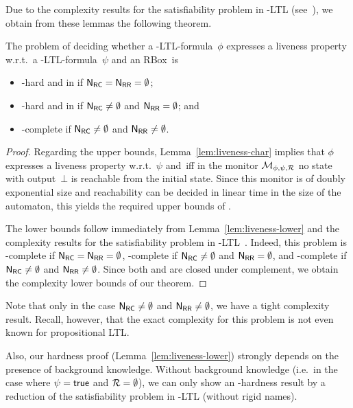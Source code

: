 \noindent
Due to the complexity results for the satisfiability problem in \ALC-LTL
(see~\cite{BaGL-ToCL12}), we obtain from these lemmas the following theorem.

\begin{theorem}
    The problem of deciding whether a \SHOQ-LTL-formula~$\phi$ expresses a
    liveness property w.r.t.~a \SHOQ-LTL-formula~$\psi$ and an RBox~\Rmc is
    \begin{itemize}
        \item \ExpTime-hard and in \TwoExpTime if $\mathsf{N_{RC}}=\mathsf{N_{RR}}=\emptyset$;
        \item \coNExpTime-hard and in \TwoExpTime if $\mathsf{N_{RC}}\ne\emptyset$ and
            $\mathsf{N_{RR}}=\emptyset$; and
        \item \TwoExpTime-complete if $\mathsf{N_{RC}}\ne\emptyset$ and $\mathsf{N_{RR}}\ne\emptyset$.
    \end{itemize}
\end{theorem}

\begin{proof}
    Regarding the upper bounds, Lemma~\ref{lem:liveness-char} implies that
    $\phi$ expresses a liveness property w.r.t.~$\psi$ and~\Rmc iff in the
    monitor $\mathcal{M}_{\phi,\psi,\mathcal{R}}$ no state with output~$\bot$ is reachable
    from the initial state.  Since this monitor is of doubly exponential size
    and reachability can be decided in linear time in the size of the automaton,
    this yields the required upper bounds of \TwoExpTime.

    The lower bounds follow immediately from Lemma~\ref{lem:liveness-lower} and
    the complexity results for the satisfiability problem in
    \ALC-LTL~\cite{BaGL-ToCL12}.  Indeed, this problem is \ExpTime-complete if
    $\mathsf{N_{RC}}=\mathsf{N_{RR}}=\emptyset$, \NExpTime-complete if $\mathsf{N_{RC}}\ne\emptyset$ and
    $\mathsf{N_{RR}}=\emptyset$, and \TwoExpTime-complete if $\mathsf{N_{RC}}\ne\emptyset$ and
    $\mathsf{N_{RR}}\ne\emptyset$.  Since both \ExpTime and \TwoExpTime are closed under
    complement, we obtain the complexity lower bounds of our theorem.
\end{proof}

\noindent
Note that only in the case $\mathsf{N_{RC}}\ne\emptyset$ and $\mathsf{N_{RR}}\ne\emptyset$, we have a
tight complexity result.  Recall, however, that the exact complexity for this
problem is not even known for propositional LTL\@.

Also, our hardness proof (Lemma~\ref{lem:liveness-lower}) strongly depends on
the presence of background knowledge.  Without background knowledge (i.e.~in the
case where $\psi=\mathsf{true}$ and $\mathcal{R}=\emptyset$), we can only show an
\ExpTime-hardness result by a reduction of the satisfiability problem in
\ALC-LTL (without rigid names).

